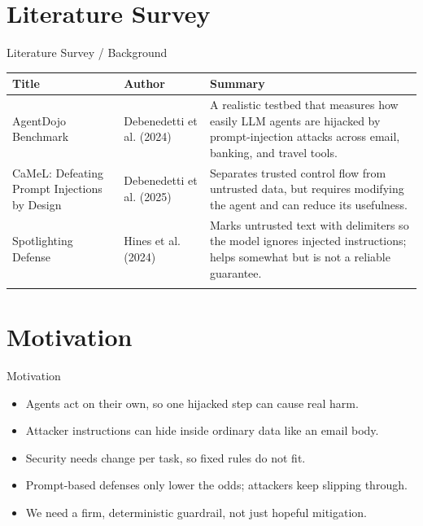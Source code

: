\documentclass[10pt]{beamer}
\begin{document}
\section{Literature Survey}
\begin{frame}{Literature Survey / Background}
  \small
  \begin{tabular}{@{}p{2.7cm}p{2.3cm}p{5.6cm}@{}}
    \toprule
    \textbf{Title} & \textbf{Author} & \textbf{Summary} \\
    \midrule
    AgentDojo Benchmark & Debenedetti et al. (2024) & A realistic testbed that measures how easily LLM agents are hijacked by prompt-injection attacks across email, banking, and travel tools. \\
    \addlinespace
    CaMeL: Defeating Prompt Injections by Design & Debenedetti et al. (2025) & Separates trusted control flow from untrusted data, but requires modifying the agent and can reduce its usefulness. \\
    \addlinespace
    Spotlighting Defense & Hines et al. (2024) & Marks untrusted text with delimiters so the model ignores injected instructions; helps somewhat but is not a reliable guarantee. \\
    \addlinespace
    \bottomrule
  \end{tabular}
\end{frame}
\section{Motivation}
\begin{frame}{Motivation}
\begin{itemize}
  \item Agents act on their own, so one hijacked step can cause real harm.
  \item Attacker instructions can hide inside ordinary data like an email body.
  \item Security needs change per task, so fixed rules do not fit.
  \item Prompt-based defenses only lower the odds; attackers keep slipping through.
  \item We need a firm, deterministic guardrail, not just hopeful mitigation.
\end{itemize}
\end{frame}
\end{document}
